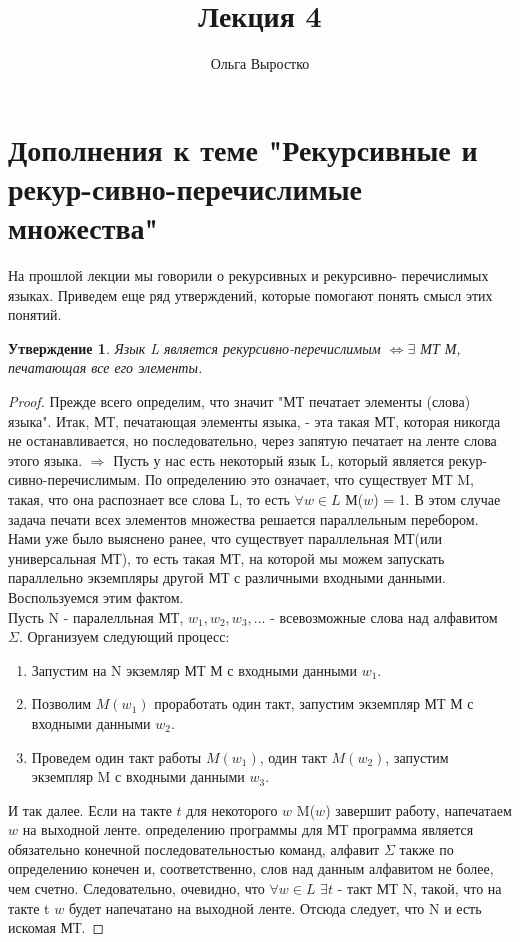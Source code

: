 \documentclass[a4paper]{article}
\title{Лекция 4}
\author{Ольга Выростко}
\newtheorem{statement}{Утверждение}
\begin{document}
\section{Дополнения к теме "Рекурсивные и рекур-сивно-перечислимые множества"}
{\large На прошлой лекции мы говорили о рекурсивных и рекурсивно- перечислимых языках. Приведем еще ряд утверждений, которые помогают понять смысл этих понятий.
\begin{statement}
Язык L является рекурсивно-перечислимым $\Leftrightarrow \exists$ МТ М, печатающая все его элементы.
\end{statement}
\begin{proof}
Прежде всего определим, что значит "МТ печатает элементы (слова) языка". Итак, МТ, печатающая элементы языка, - эта такая МТ, которая никогда не останавливается, но последовательно, через запятую печатает на ленте слова этого языка. 
\newline$\Rightarrow$
Пусть у нас есть некоторый язык L, который является рекур-сивно-перечислимым. По определению это означает, что существует МТ M, такая, что она распознает все слова L, то есть $\forall w \in L$ М($w$) = 1.
\newline В этом случае задача печати всех элементов множества решается параллельным перебором. Нами уже было выяснено ранее, что существует параллельная МТ(или универсальная МТ), то есть такая МТ, на которой мы можем запускать параллельно экземпляры другой МТ с различными входными данными. Воспользуемся этим фактом. 
\\Пусть N - паралелльная МТ, $w_1, w_2, w_3,...$ - всевозможные слова над алфавитом $\Sigma$. Организуем следующий процесс:
\begin{enumerate}
\item Запустим на N экземляр МТ М с входными данными $w_1$.
\item Позволим $M(w_1)$ проработать один такт, запустим экземпляр МТ М с входными данными $w_2$.
\item Проведем один такт работы $M(w_1)$, один такт $M(w_2)$, запустим экземпляр M с входными данными $w_3$.
\end{enumerate}
И так далее. Если на такте $t$ для некоторого $w$ M($w$) завершит работу, напечатаем $w$ на выходной ленте.
 определению программы для МТ программа является обязательно конечной последовательностью команд, алфавит $\Sigma$ также по определению конечен и, соответственно, слов над данным алфавитом не более, чем счетно. Следовательно, очевидно, что $\forall w \in L$ $\exists t$ - такт МТ N, такой, что на такте t $w$ будет напечатано на выходной ленте. Отсюда следует, что N и есть искомая МТ.

\end{proof}}
\end{document}

